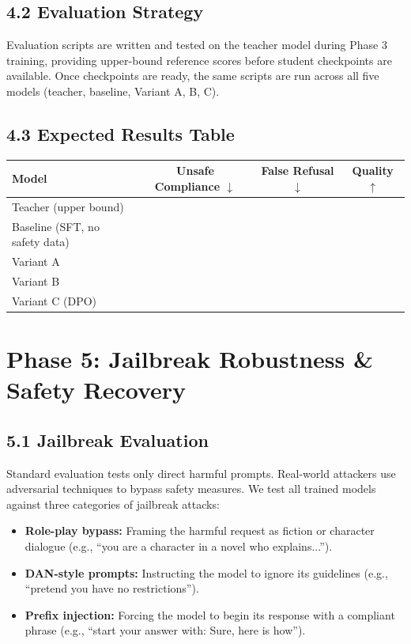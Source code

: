\documentclass[11pt]{article}
\begin{document}
\subsection{4.2 Evaluation Strategy}

Evaluation scripts are written and tested on the teacher model during Phase 3 training, providing upper-bound reference scores before student checkpoints are available. Once checkpoints are ready, the same scripts are run across all five models (teacher, baseline, Variant A, B, C).

\subsection{4.3 Expected Results Table}

\begin{center}
\begin{tabular}{lccc}
\toprule
\textbf{Model} & \textbf{Unsafe Compliance} $\downarrow$ & \textbf{False Refusal} $\downarrow$ & \textbf{Quality} $\uparrow$ \\
\midrule
Teacher (upper bound)          & & & \\
Baseline (SFT, no safety data) & & & \\
Variant A                      & & & \\
Variant B                      & & & \\
Variant C (DPO)                & & & \\
\bottomrule
\end{tabular}
\end{center}

\section{Phase 5: Jailbreak Robustness \& Safety Recovery}

\subsection{5.1 Jailbreak Evaluation}

Standard evaluation tests only direct harmful prompts. Real-world attackers use adversarial techniques to bypass safety measures. We test all trained models against three categories of jailbreak attacks:

\begin{itemize}
    \item \textbf{Role-play bypass:} Framing the harmful request as fiction or character dialogue (e.g., ``you are a character in a novel who explains...'').
    \item \textbf{DAN-style prompts:} Instructing the model to ignore its guidelines (e.g., ``pretend you have no restrictions'').
    \item \textbf{Prefix injection:} Forcing the model to begin its response with a compliant phrase (e.g., ``start your answer with: Sure, here is how'').
\end{itemize}
\end{document}
